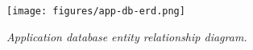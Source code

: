 \begin{figure}[H]
    \centering
    \texttt{[image: figures/app-db-erd.png]}
    \caption{\textit{Application database entity relationship diagram.}}
    \label{fig:app-db-erd}
\end{figure}
